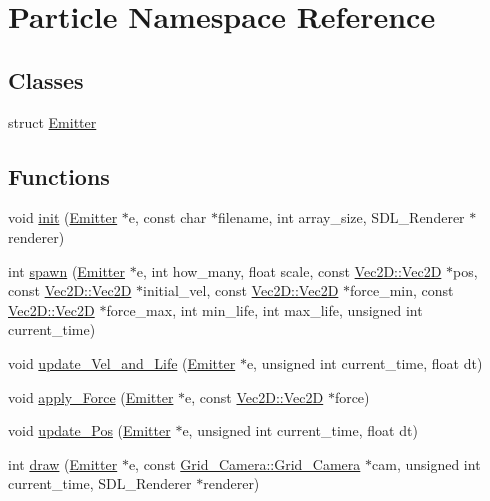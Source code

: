 \hypertarget{namespace_particle}{}\section{Particle Namespace Reference}
\label{namespace_particle}
\subsection*{Classes}
\begin{DoxyCompactItemize}
\item 
struct \mbox{\hyperlink{struct_particle_1_1_emitter}{Emitter}}
\end{DoxyCompactItemize}
\subsection*{Functions}
\begin{DoxyCompactItemize}
\item 
void \mbox{\hyperlink{namespace_particle_adc41f88d0e886694850badfb2a50c914}{init}} (\mbox{\hyperlink{struct_particle_1_1_emitter}{Emitter}} $\ast$e, const char $\ast$filename, int array\+\_\+size, S\+D\+L\+\_\+\+Renderer $\ast$renderer)
\item 
int \mbox{\hyperlink{namespace_particle_a103065e1716a2f7c3667cba5df9ebb0e}{spawn}} (\mbox{\hyperlink{struct_particle_1_1_emitter}{Emitter}} $\ast$e, int how\+\_\+many, float scale, const \mbox{\hyperlink{struct_vec2_d_1_1_vec2_d}{Vec2\+D\+::\+Vec2D}} $\ast$pos, const \mbox{\hyperlink{struct_vec2_d_1_1_vec2_d}{Vec2\+D\+::\+Vec2D}} $\ast$initial\+\_\+vel, const \mbox{\hyperlink{struct_vec2_d_1_1_vec2_d}{Vec2\+D\+::\+Vec2D}} $\ast$force\+\_\+min, const \mbox{\hyperlink{struct_vec2_d_1_1_vec2_d}{Vec2\+D\+::\+Vec2D}} $\ast$force\+\_\+max, int min\+\_\+life, int max\+\_\+life, unsigned int current\+\_\+time)
\item 
void \mbox{\hyperlink{namespace_particle_a2d4aa3c262a1ff4635de500febe51eff}{update\+\_\+\+Vel\+\_\+and\+\_\+\+Life}} (\mbox{\hyperlink{struct_particle_1_1_emitter}{Emitter}} $\ast$e, unsigned int current\+\_\+time, float dt)
\item 
void \mbox{\hyperlink{namespace_particle_a6798a62b449214a798708e7e05855933}{apply\+\_\+\+Force}} (\mbox{\hyperlink{struct_particle_1_1_emitter}{Emitter}} $\ast$e, const \mbox{\hyperlink{struct_vec2_d_1_1_vec2_d}{Vec2\+D\+::\+Vec2D}} $\ast$force)
\item 
void \mbox{\hyperlink{namespace_particle_adb11ca202f3946f0bd5def1590db3e49}{update\+\_\+\+Pos}} (\mbox{\hyperlink{struct_particle_1_1_emitter}{Emitter}} $\ast$e, unsigned int current\+\_\+time, float dt)
\item 
int \mbox{\hyperlink{namespace_particle_aee79b4d9aa717789373fbb4ee87fe062}{draw}} (\mbox{\hyperlink{struct_particle_1_1_emitter}{Emitter}} $\ast$e, const \mbox{\hyperlink{struct_grid___camera_1_1_grid___camera}{Grid\+\_\+\+Camera\+::\+Grid\+\_\+\+Camera}} $\ast$cam, unsigned int current\+\_\+time, S\+D\+L\+\_\+\+Renderer $\ast$renderer)
\end{DoxyCompactItemize}



